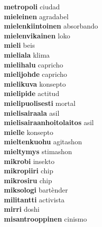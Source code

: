 \textbf{metropoli } ciudad \\
\textbf{mieleinen } agradabel \\
\textbf{mielenkiintoinen } absorbando \\
\textbf{mielenvikainen } loko \\
\textbf{mieli } beis \\
\textbf{mieliala } klima \\
\textbf{mielihalu } capricho \\
\textbf{mielijohde } capricho \\
\textbf{mielikuva } konsepto \\
\textbf{mielipide } actitud \\
\textbf{mielipuolisesti } mortal \\
\textbf{mielisairaala } asil \\
\textbf{mielisairaanhoitolaitos } asil \\
\textbf{mielle } konsepto \\
\textbf{mieltenkuohu } agitashon \\
\textbf{mieltymys } stimashon \\
\textbf{mikrobi } insekto \\
\textbf{mikropiiri } chip \\
\textbf{mikrosiru } chip \\
\textbf{miksologi } bartènder \\
\textbf{militantti } activista \\
\textbf{mirri } doshi \\
\textbf{misantrooppinen } cinismo \\
